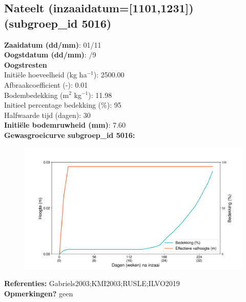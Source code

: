 \documentclass{article}
\begin{document}
 \subsection{Nateelt (inzaaidatum=[1101,1231]) (subgroep\_id 5016)} 
  \textbf{Zaaidatum (dd/mm)}: 01/11  \vspace{0.10cm} \\ 
  \textbf{Oogstdatum (dd/mm)}: /9  \vspace{0.10cm} \\ 
  \textbf{Oogstresten} \vspace{0.05cm} \\ 
  \tab Initi\"{e}le hoeveelheid (kg ha$^{-1}$): 2500.00 \vspace{0.05cm} \\ 
  \tab Afbraakcoefficient (-): 0.01 \vspace{0.05cm} \\ 
  \tab Bodembedekking (m$^2$ kg$^{-1}$): 11.98 \vspace{0.05cm} \\ 
  \tab Initieel percentage bedekking (\%): 95 \vspace{0.05cm} \\ 
  \tab Halfwaarde tijd (dagen): 30 \vspace{0.05cm} \\ 
  \textbf{Initi\"{e}le bodemruwheid (mm)}: 7.60 \vspace{0.05cm} \\ 
  \textbf{Gewasgroeicurve subgroep\_id 5016:} 
 \begin{center} \begin{figure}[H] \includegraphics[width=12.5cm]{temp/5016.png} \end{figure} \end{center} 
  \textbf{Referenties:} Gabriels2003;KMI2003;RUSLE;ILVO2019 \vspace{0.10cm} \\ 
  \textbf{Opmerkingen?} geen \vspace{0.10cm} \\ 
 \newpage 
\end{document}
